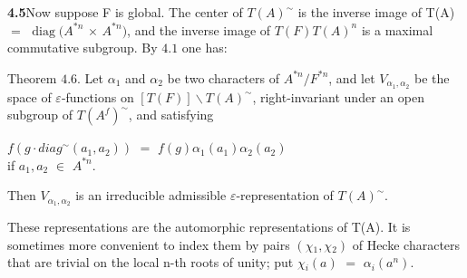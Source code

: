 \documentclass[10pt,a4paper]{article}
\begin{document}
\par\noindent\textbf{4.5}\quad Now suppose F is global. The center of $T(A)^\sim$ is the inverse image of T(A) $=$ $\operatorname{diag}(A^{*n}$ $\times{}$ $A^{*n})$, and the inverse image of $T(F)T(A)^n$ is a maximal commutative subgroup. By $4.1$ one has:\par
\par Theorem $4.6$. Let $\alpha{}_1$ and $\alpha{}_2$ be two characters of $A^{*n}/F^{*n}$, and let $V_{\alpha{}_1,\alpha{}_2}$ be the space of $\varepsilon{}$-functions on $[T(F)]\backslash T(A)^\sim$, right-invariant under an open subgroup of $T(A^f)^\sim$, and satisfying\par
\par\smallskip\begin{center}\begin{minipage}{0.96\textwidth}\centering
$f(g\cdot{}diag^\sim(a_1,a_2))$ $=$ $f(g)\alpha{}_1(a_1)\alpha{}_2(a_2)$ \\ if $a_1,a_2$ $\in{}$ $A^{*n}$.
\end{minipage}\end{center}\smallskip
\par Then $V_{\alpha{}_1,\alpha{}_2}$ is an irreducible admissible $\varepsilon{}$-representation of $T(A)^\sim$.\par
\par These representations are the automorphic representations of T(A). It is sometimes more convenient to index them by pairs $(\chi{}_1,\chi{}_2)$ of Hecke characters that are trivial on the local n-th roots of unity; put $\chi{}_i(a)$ $=$ $\alpha{}_i(a^n)$.\par
\end{document}
